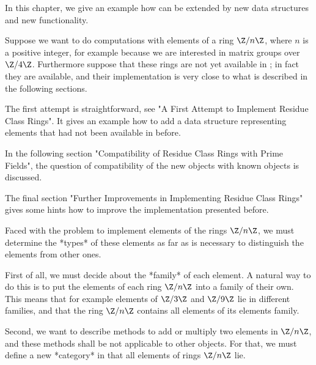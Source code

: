 

In this chapter, we give an example how {\GAP} can be extended
by new data structures and new functionality.

Suppose we want to do computations with elements of a ring $\Z/n\Z$,
where $n$ is a positive integer,
for example because we are interested in matrix groups over $\Z/4\Z$.
Furthermore suppose that these rings are not yet available in {\GAP};
in fact they are available, and their implementation is very close to
what is described in the following sections.

The first attempt is straightforward,
see "A First Attempt to Implement Residue Class Rings".
It gives an example how to add a data structure representing elements
that had not been available in {\GAP} before.

In the following section
"Compatibility of Residue Class Rings with Prime Fields",
the question of compatibility of the new objects with known objects is
discussed.

The final section
"Further Improvements in Implementing Residue Class Rings"
gives some hints how to improve the implementation presented before.


Faced with the problem to implement elements of the rings $\Z/n\Z$,
we must determine the *types* of these elements as far as is necessary to
distinguish the elements from other ones.

First of all, we must decide about the *family* of each element.
A natural way to do this is to put the elements of each ring $\Z/n\Z$
into a family of their own.
This means that for example elements of $\Z/3\Z$ and $\Z/9\Z$ lie
in different families,
and that the ring $\Z/n\Z$ contains all elements of its elements family.

Second, we want to describe methods to add or multiply two elements in
$\Z/n\Z$,
and these methods shall be not applicable to other {\GAP} objects.
For that, we must define a new *category* in that all elements of rings
$\Z/n\Z$ lie.

